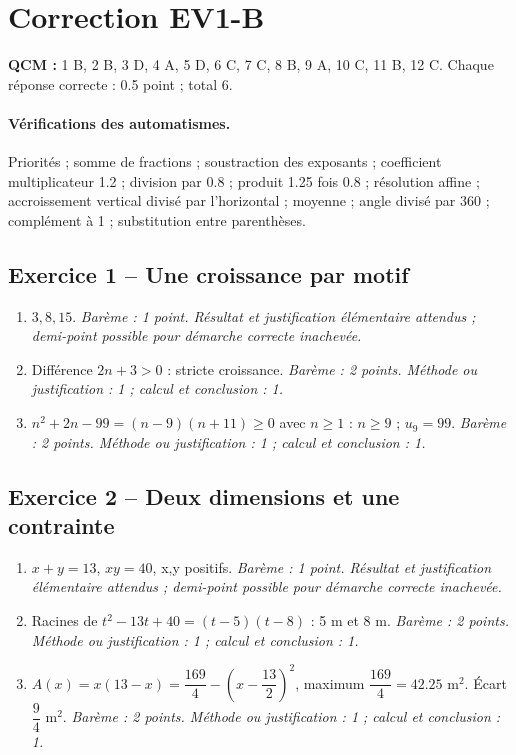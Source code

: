 \mxnewpage\section*{Correction EV1-B}\label{EV1-B-CORR}
\textbf{QCM :} 1 B, 2 B, 3 D, 4 A, 5 D, 6 C, 7 C, 8 B, 9 A, 10 C, 11 B, 12 C. Chaque réponse correcte : \num{0,5} point ; total 6.
\paragraph{Vérifications des automatismes.} Priorités ; somme de fractions ; soustraction des exposants ; coefficient multiplicateur \num{1,2} ; division par \num{0,8} ; produit \num{1,25} fois \num{0,8} ; résolution affine ; accroissement vertical divisé par l’horizontal ; moyenne ; angle divisé par 360 ; complément à 1 ; substitution entre parenthèses.
\subsection*{Exercice 1 -- Une croissance par motif}
\begin{enumerate}
\item $3,8,15$. \textit{Barème : 1 point. Résultat et justification élémentaire attendus ; demi-point possible pour démarche correcte inachevée.}
\item Différence $2n+3>0$ : stricte croissance. \textit{Barème : 2 points. Méthode ou justification : 1 ; calcul et conclusion : 1.}
\item $n^2+2n-99=(n-9)(n+11)\geq0$ avec $n\geq1$ : $n\geq9$ ; $u_9=99$. \textit{Barème : 2 points. Méthode ou justification : 1 ; calcul et conclusion : 1.}
\end{enumerate}
\subsection*{Exercice 2 -- Deux dimensions et une contrainte}
\begin{enumerate}
\item $x+y=13$, $xy=40$, x,y positifs. \textit{Barème : 1 point. Résultat et justification élémentaire attendus ; demi-point possible pour démarche correcte inachevée.}
\item Racines de $t^2-13t+40=(t-5)(t-8)$ : 5 m et 8 m. \textit{Barème : 2 points. Méthode ou justification : 1 ; calcul et conclusion : 1.}
\item $A(x)=x(13-x)=\dfrac{169}{4}-(x-\dfrac{13}{2})^2$, maximum $\dfrac{169}{4}=\num{42,25}$ m$^2$. Écart $\dfrac{9}{4}$ m$^2$. \textit{Barème : 2 points. Méthode ou justification : 1 ; calcul et conclusion : 1.}
\end{enumerate}
